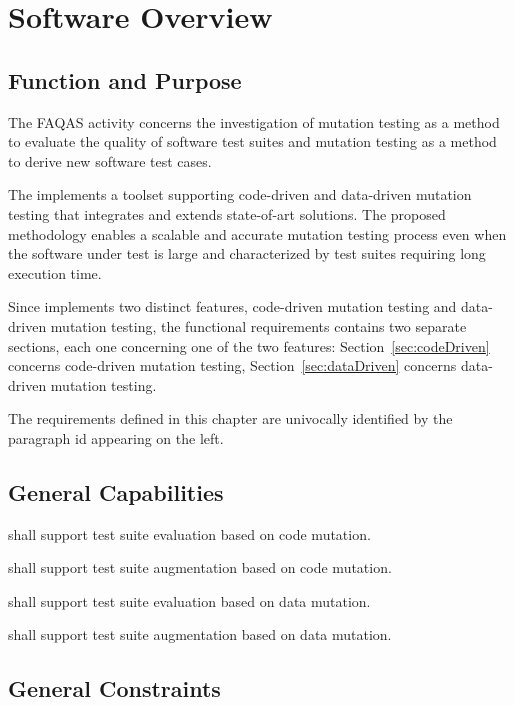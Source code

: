 
\chapter{Software Overview}
\label{chapter:overview}

\section{Function and Purpose}

The FAQAS activity concerns the investigation of mutation testing as a method to evaluate the quality of software test suites and mutation testing as a method to derive new software test cases. 

The \FAQAS implements a toolset supporting code-driven and data-driven mutation testing that integrates and extends state-of-art solutions. The proposed methodology enables a scalable and accurate mutation testing process even when the software under test is large and characterized by test suites requiring long execution time.

Since \FAQAS implements two distinct features, code-driven mutation testing and data-driven mutation testing, the functional requirements contains two separate sections, each one concerning one of the two features: Section~\ref{sec:codeDriven} concerns code-driven mutation testing, Section~\ref{sec:dataDriven} concerns data-driven mutation testing.

The requirements defined in this chapter are univocally identified by the paragraph id appearing on the left.

\section{General Capabilities}

\RQ{} \FAQAS shall support test suite evaluation based on code mutation.

\RQ{} \FAQAS shall support test suite augmentation based on code mutation.

\RQ{} \FAQAS shall support test suite evaluation based on data mutation.

\RQ{} \FAQAS shall support test suite augmentation based on data mutation.


\section{General Constraints}

